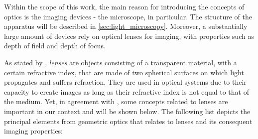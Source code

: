 Within the scope of this work, the main reason for introducing the concepts of optics is the imaging devices - the microscope, in particular. The structure of the apparatus will be described in \autoref{sec:light_microscopy}. Moreover, a substantially large amount of devices rely on optical lenses for imaging, with properties such as depth of field and depth of focus.

As stated by , \emph{lenses} are objects consisting of a transparent material, with a certain refractive index, that are made of two spherical surfaces on which light propagates and suffers refraction. They are used in optical systems due to their capacity to create images as long as their refractive index is not equal to that of the medium. Yet, in agreement with , some concepts related to lenses are important in our context and will be shown below. The following list depicts the principal elements from geometric optics that relates to lenses and its consequent imaging properties:

